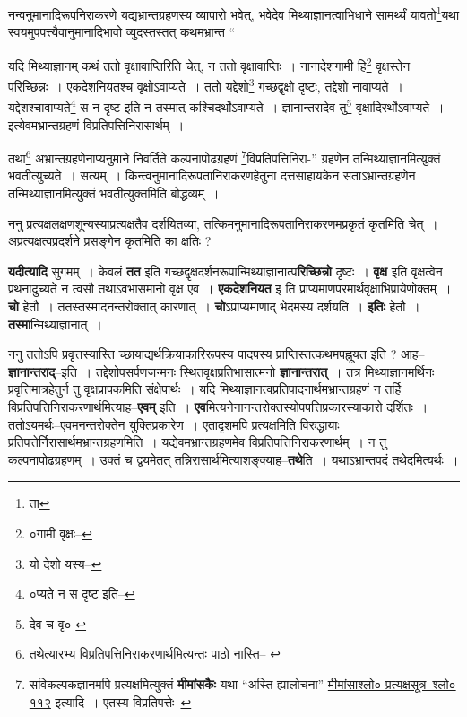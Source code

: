 \documentclass[article,12pt,a4paper]{memoir}
\begin{document}
	  \pstart नन्वनुमानादिरूपनिराकरणे यद्यभ्रान्तग्रहणस्य व्यापारो भवेत्, भवेदेव मिथ्याज्ञानत्वाभिधाने सामर्थ्यं यावतो\footnote{ता}\-यथा स्वयमुपपत्त्यैवानुमानादिभावो व्युदस्तस्तत् कथमभ्रान्त \leavevmode{} “
	  
	यदि मिथ्याज्ञानम् कथं ततो वृक्षावाप्तिरिति चेत्, न ततो वृक्षावाप्तिः । नानादेशगामी हि\footnote{०गामी वृक्षः--\cite{dp-msC}} वृक्षस्तेन परिच्छिन्नः । एकदेशनियतश्च वृक्षोऽवाप्यते । ततो यद्देशो\footnote{यो देशो यस्य--\cite{dp-msD-n}} गच्छद्वृक्षो दृष्टः, तद्देशो नावाप्यते । यद्देशश्चावाप्यते\footnote{०प्यते न स दृष्ट इति--\cite{dp-msC}} स न दृष्ट इति न तस्मात् कश्चिदर्थोऽवाप्यते । ज्ञानान्तरादेव तु\footnote{देव च वृ० \cite{dp-msB} \cite{dp-msD}} वृक्षादिरर्थोऽवाप्यते । इत्येवमभ्रान्तग्रहणं विप्रतिपत्तिनिरासार्थम् । 
	  
	तथा\footnote{तथेत्यारभ्य विप्रतिपत्तिनिराकरणार्थमित्यन्तः पाठो नास्ति--\cite{dp-msA} \cite{dp-edP} \cite{dp-edE} \cite{dp-edH}} अभ्रान्तग्रहणेनाप्यनुमाने निवर्तिते कल्पनापोढग्रहणं \footnote{सविकल्पकज्ञानमपि प्रत्यक्षमित्युक्तं \textbf{मीमांसकैः} यथा “अस्ति ह्यालोचना” \href{http://http://sarit.indology.info/?cref=śv-pratyakṣa.112}{मीमांसाश्लो० प्रत्यक्षसूत्र--श्लो० ११२} इत्यादि । एतस्य विप्रतिपत्तेः--\cite{dp-msD-n}}\-विप्रतिपत्तिनिरा-” ग्रहणेन तन्मिथ्याज्ञानमित्युक्तं भवतीत्युच्यते । सत्यम् । किन्त्वनुमानादिरूपतानिराकरणहेतुना दत्तसाहायकेन सताऽभ्रान्तग्रहणेन तन्मिथ्याज्ञानमित्युक्तं भवतीत्युक्तमिति बोद्धव्यम् ।
	\pend
      

	  \pstart ननु प्रत्यक्षलक्षणशून्यस्याप्रत्यक्षतैव दर्शयितव्या, तत्किमनुमानादिरूपतानिराकरणमप्रकृतं कृतमिति चेत् । अप्रत्यक्षत्वप्रदर्शने प्रसङ्गेन कृतमिति का क्षतिः ?
	\pend
      

	  \pstart \textbf{यदीत्यादि} सुगमम् । केवलं \textbf{तत} इति गच्छद्वृक्षदर्शनरूपान्मिथ्याज्ञानात्प\textbf{रिच्छिन्नो} दृष्टः । \textbf{वृक्ष} इति वृक्षत्वेन प्रथनादुच्यते न त्वसौ तथाऽवभासमानो वृक्ष एव । \textbf{एकदेशनियत} इ ति प्राप्यमाणपरमार्थवृक्षाभिप्रायेणोक्तम् । \textbf{चो} हेतौ । ततस्तस्मादनन्तरोक्तात् कारणात् । \textbf{चो}ऽप्राप्यमाणाद् भेदमस्य दर्शयति । \textbf{इतिः} हेतौ । \textbf{तस्मा}न्मिथ्याज्ञानात् ।
	\pend
      

	  \pstart ननु ततोऽपि प्रवृत्तस्यास्ति च्छायाद्यर्थक्रियाकारिरूपस्य पादपस्य प्राप्तिस्तत्कथमपह्नूयत इति ? आह--\textbf{ज्ञानान्तराद्}--इति । तद्देशोपसर्पणजन्मनः स्थितवृक्षप्रतिभासात्मनो \textbf{ज्ञानान्तरात्} । तत्र मिथ्याज्ञानमर्थिनः प्रवृत्तिमात्रहेतुर्न तु वृक्षप्रापकमिति संक्षेपार्थः । यदि मिथ्याज्ञानत्वप्रतिपादनार्थमभ्रान्तग्रहणं न तर्हि विप्रतिपत्तिनिराकरणार्थमित्याह--\textbf{एवम्} इति । \textbf{एव}मित्यनेनानन्तरोक्तस्योपपत्तिप्रकारस्याकारो दर्शितः । ततोऽयमर्थः--एवमनन्तरोक्तेन युक्तिप्रकारेण । एतादृशमपि प्रत्यक्षमिति विरुद्धायाः प्रतिपत्तेर्निरासार्थमभ्रान्तग्रहणमिति । यद्येवमभ्रान्तग्रहणमेव विप्रतिपत्तिनिराकरणार्थम् । न तु कल्पनापोढग्रहणम् । उक्तं च द्वयमेतत् तन्निरासार्थमित्याशङ्क्याह--\textbf{तथे}ति । यथाऽभ्रान्तपदं तथेदमित्यर्थः ।
	\pend
      
\end{document}

